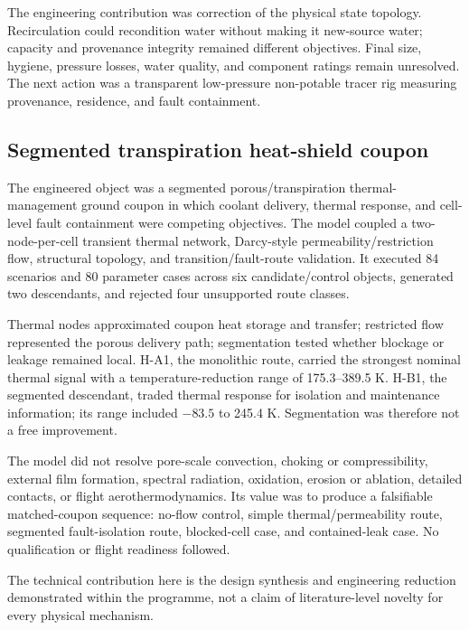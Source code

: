The engineering contribution was correction of the physical state topology. Recirculation could recondition water without making it new-source water; capacity and provenance integrity remained different objectives. Final size, hygiene, pressure losses, water quality, and component ratings remain unresolved. The next action was a transparent low-pressure non-potable tracer rig measuring provenance, residence, and fault containment.

\subsection{Segmented transpiration heat-shield coupon}
The engineered object was a segmented porous/transpiration thermal-management ground coupon in which coolant delivery, thermal response, and cell-level fault containment were competing objectives. The model coupled a two-node-per-cell transient thermal network, Darcy-style permeability/restriction flow, structural topology, and transition/fault-route validation. It executed 84 scenarios and 80 parameter cases across six candidate/control objects, generated two descendants, and rejected four unsupported route classes.

Thermal nodes approximated coupon heat storage and transfer; restricted flow represented the porous delivery path; segmentation tested whether blockage or leakage remained local. H-A1, the monolithic route, carried the strongest nominal thermal signal with a temperature-reduction range of 175.3--389.5 K. H-B1, the segmented descendant, traded thermal response for isolation and maintenance information; its range included $-83.5$ to 245.4 K. Segmentation was therefore not a free improvement.

The model did not resolve pore-scale convection, choking or compressibility, external film formation, spectral radiation, oxidation, erosion or ablation, detailed contacts, or flight aerothermodynamics. Its value was to produce a falsifiable matched-coupon sequence: no-flow control, simple thermal/permeability route, segmented fault-isolation route, blocked-cell case, and contained-leak case. No qualification or flight readiness followed.

The technical contribution here is the design synthesis and engineering reduction demonstrated within the programme, not a claim of literature-level novelty for every physical mechanism.
